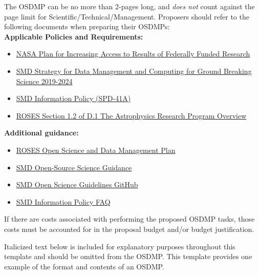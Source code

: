 \documentclass[letterpaper,12pt]{article}
\begin{document}
The OSDMP can be no more than 2-pages long, and \textit{does not} count against the page limit for Scientific/Technical/Management. Proposers should refer to the following documents when preparing their OSDMPs:\\

\textbf{Applicable Policies and Requirements:}
\begin{itemize}
\item \href{https://smd-cms.nasa.gov/wp-content/uploads/2023/05/NASA_Plan_for_increasing_access_to_results_of_federally_funded_research1.pdf}{NASA Plan for Increasing Access to Results of Federally Funded Research} 
\item \href{https://smd-cms.nasa.gov/wp-content/uploads/2023/06/SDMWG_Full_Document_v3.pdf}{SMD Strategy for Data Management and Computing for Ground Breaking Science 2019-2024}
\item \href{https://science.nasa.gov/researchers/science-data/science-information-policy/}{SMD Information Policy (SPD-41A)} 
\item \href{https://nspires.nasaprs.com/external/viewrepositorydocument/cmdocumentid=912462/solicitationId=%7bD6BA6770-6C78-B231-74CC-4B8FE91E5AD4%7d/viewSolicitationDocument=1/D.01%20Astro%20Overview%20OSDMP%20clarify%20051523.pdf}{ROSES Section 1.2 of D.1 The Astrophysics Research Program Overview}
\end{itemize}

\textbf{Additional guidance:}
\begin{itemize}
    \item \href{https://science.nasa.gov/researchers/sara/faqs/osdmp/}{ROSES Open Science and Data Management Plan} 
    \item  \href{https://science.nasa.gov/oss-guidance}{SMD Open-Source Science Guidance}
    \item \href{https://github.com/nasa/smd-open-science-guidelines}{SMD Open Science Guidelines GitHub}
    \item \href{https://science.nasa.gov/researchers/open-science/science-information-policy_faq/}{SMD Information Policy FAQ}
  
\end{itemize}

\noindent If there are costs associated with performing the proposed OSDMP tasks, those costs must be accounted for in the proposal budget and/or budget justification. 

Italicized text below is included for explanatory purposes throughout this template and should be omitted from the OSDMP. This template provides one example of the format and contents of an OSDMP.
\end{document}
